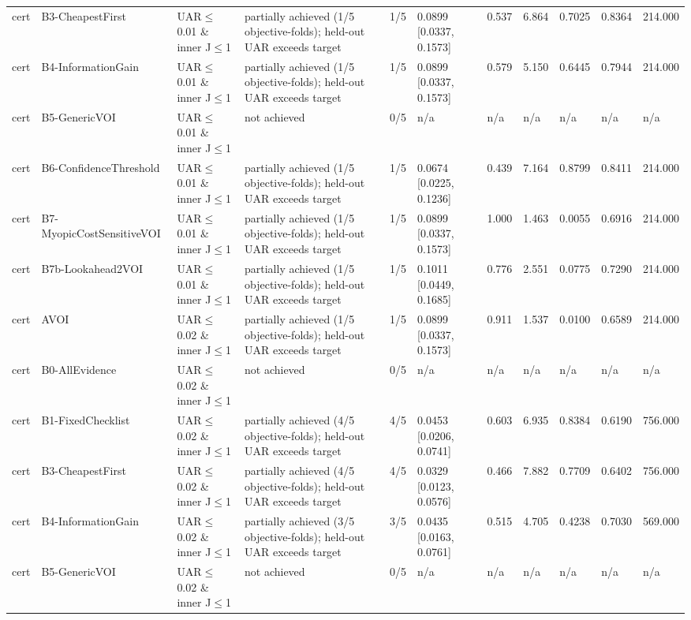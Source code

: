 \begin{table}[!ht]
{\begin{tabular}{lllllllllll}
cert & B3-CheapestFirst & UAR$\le$0.01 \& inner J$\le$1 & partially achieved (1/5 objective-folds); held-out UAR exceeds target & 1/5 & 0.0899 [0.0337, 0.1573] & 0.537 & 6.864 & 0.7025 & 0.8364 & 214.000 \\
cert & B4-InformationGain & UAR$\le$0.01 \& inner J$\le$1 & partially achieved (1/5 objective-folds); held-out UAR exceeds target & 1/5 & 0.0899 [0.0337, 0.1573] & 0.579 & 5.150 & 0.6445 & 0.7944 & 214.000 \\
cert & B5-GenericVOI & UAR$\le$0.01 \& inner J$\le$1 & not achieved & 0/5 & n/a & n/a & n/a & n/a & n/a & n/a \\
cert & B6-ConfidenceThreshold & UAR$\le$0.01 \& inner J$\le$1 & partially achieved (1/5 objective-folds); held-out UAR exceeds target & 1/5 & 0.0674 [0.0225, 0.1236] & 0.439 & 7.164 & 0.8799 & 0.8411 & 214.000 \\
cert & B7-MyopicCostSensitiveVOI & UAR$\le$0.01 \& inner J$\le$1 & partially achieved (1/5 objective-folds); held-out UAR exceeds target & 1/5 & 0.0899 [0.0337, 0.1573] & 1.000 & 1.463 & 0.0055 & 0.6916 & 214.000 \\
cert & B7b-Lookahead2VOI & UAR$\le$0.01 \& inner J$\le$1 & partially achieved (1/5 objective-folds); held-out UAR exceeds target & 1/5 & 0.1011 [0.0449, 0.1685] & 0.776 & 2.551 & 0.0775 & 0.7290 & 214.000 \\
cert & AVOI & UAR$\le$0.02 \& inner J$\le$1 & partially achieved (1/5 objective-folds); held-out UAR exceeds target & 1/5 & 0.0899 [0.0337, 0.1573] & 0.911 & 1.537 & 0.0100 & 0.6589 & 214.000 \\
cert & B0-AllEvidence & UAR$\le$0.02 \& inner J$\le$1 & not achieved & 0/5 & n/a & n/a & n/a & n/a & n/a & n/a \\
cert & B1-FixedChecklist & UAR$\le$0.02 \& inner J$\le$1 & partially achieved (4/5 objective-folds); held-out UAR exceeds target & 4/5 & 0.0453 [0.0206, 0.0741] & 0.603 & 6.935 & 0.8384 & 0.6190 & 756.000 \\
cert & B3-CheapestFirst & UAR$\le$0.02 \& inner J$\le$1 & partially achieved (4/5 objective-folds); held-out UAR exceeds target & 4/5 & 0.0329 [0.0123, 0.0576] & 0.466 & 7.882 & 0.7709 & 0.6402 & 756.000 \\
cert & B4-InformationGain & UAR$\le$0.02 \& inner J$\le$1 & partially achieved (3/5 objective-folds); held-out UAR exceeds target & 3/5 & 0.0435 [0.0163, 0.0761] & 0.515 & 4.705 & 0.4238 & 0.7030 & 569.000 \\
cert & B5-GenericVOI & UAR$\le$0.02 \& inner J$\le$1 & not achieved & 0/5 & n/a & n/a & n/a & n/a & n/a & n/a \\

\end{tabular}}
\end{table}
